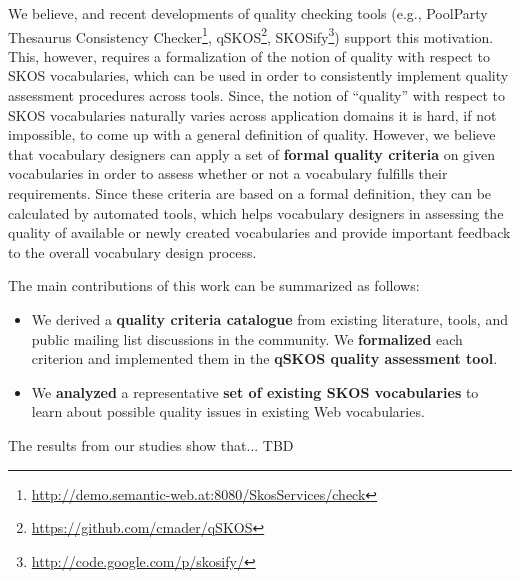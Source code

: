 We believe, and recent developments of quality checking tools (e.g., PoolParty Thesaurus Consistency Checker\footnote{\url{http://demo.semantic-web.at:8080/SkosServices/check}}, qSKOS\footnote{\url{https://github.com/cmader/qSKOS}}, SKOSify\footnote{\url{http://code.google.com/p/skosify/}}) support this motivation. This, however, requires a formalization of the notion of quality with respect to SKOS vocabularies, which can be used in order to consistently implement quality assessment procedures across tools. Since, the notion of “quality” with respect to SKOS vocabularies naturally varies across application domains it is hard, if not impossible, to come up with a general definition of quality. However, we believe that vocabulary designers can apply a set of \textbf{formal quality criteria} on given vocabularies in order to assess whether or not a vocabulary fulfills their requirements. Since these criteria are based on a formal definition, they can be calculated by automated tools, which helps vocabulary designers in assessing the quality of available or newly created vocabularies and provide important feedback to the overall vocabulary design process.

The main contributions of this work can be summarized as follows:
\begin{itemize}
	\item We derived a \textbf{quality criteria catalogue} from existing literature, tools, and public mailing list discussions in the community. We \textbf{formalized} each criterion and implemented them in the \textbf{qSKOS quality assessment tool}.

	\item We \textbf{analyzed} a representative \textbf{set of existing SKOS vocabularies} to learn about possible quality issues in existing Web vocabularies.
\end{itemize}

The results from our studies show that... TBD
